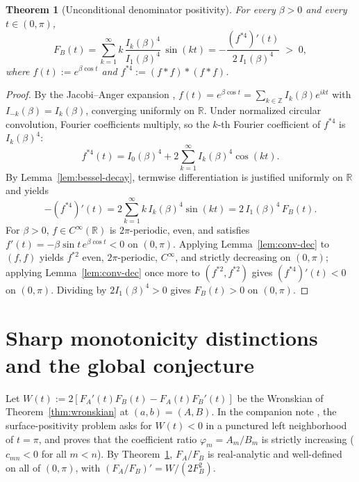 \documentclass[11pt]{article}
\newtheorem{theorem}{Theorem}
\theoremstyle{remark}
\begin{document}
\begin{theorem}[Unconditional denominator positivity]
\label{thm:denom-pos}
For every $\beta > 0$ and every $t \in (0,\pi)$,
\[
F_B(t) = \sum_{k=1}^\infty k\,\frac{I_k(\beta)^4}{I_1(\beta)^4}\,\sin(kt)
= -\frac{(f^{*4})'(t)}{2\,I_1(\beta)^4} \;>\; 0,
\]
where $f(t) := e^{\beta\cos t}$ and $f^{*4} := (f*f)*(f*f)$.
\end{theorem}

\begin{proof}
By the Jacobi--Anger expansion \cite[10.35.2]{DLMF},
$f(t) = e^{\beta\cos t} = \sum_{k\in\mathbb{Z}} I_k(\beta) e^{ikt}$ with
$I_{-k}(\beta) = I_k(\beta)$, converging uniformly on $\mathbb{R}$. Under normalized
circular convolution, Fourier coefficients multiply, so the $k$-th Fourier coefficient of
$f^{*4}$ is $I_k(\beta)^4$:
\[
f^{*4}(t) = I_0(\beta)^4 + 2\sum_{k=1}^\infty I_k(\beta)^4 \cos(kt).
\]
By Lemma~\ref{lem:bessel-decay}, termwise differentiation is justified uniformly on
$\mathbb{R}$ and yields
\[
-(f^{*4})'(t) = 2\sum_{k=1}^\infty k\,I_k(\beta)^4\sin(kt) = 2\,I_1(\beta)^4\,F_B(t).
\]
For $\beta > 0$, $f \in C^\infty(\mathbb{R})$ is $2\pi$-periodic, even, and satisfies
$f'(t) = -\beta\sin t\,e^{\beta\cos t} < 0$ on $(0,\pi)$. Applying
Lemma~\ref{lem:conv-dec} to $(f,f)$ yields $f^{*2}$ even, $2\pi$-periodic, $C^\infty$,
and strictly decreasing on $(0,\pi)$; applying Lemma~\ref{lem:conv-dec} once more to
$(f^{*2}, f^{*2})$ gives $(f^{*4})'(t) < 0$ on $(0,\pi)$. Dividing by
$2 I_1(\beta)^4 > 0$ gives $F_B(t) > 0$ on $(0,\pi)$.
\end{proof}

\section{Sharp monotonicity distinctions and the global conjecture}
\label{sec:conjecture}

Let $W(t) := 2[F_A'(t)F_B(t) - F_A(t)F_B'(t)]$ be the Wronskian of Theorem~\ref{thm:wronskian}
at $(a,b)=(A,B)$. In the companion note \cite{PhiLemma}, the surface-positivity problem
asks for $W(t) < 0$ in a punctured left neighborhood of $t = \pi$, and proves that the
coefficient ratio $\varphi_m = A_m/B_m$ is strictly increasing ($c_{mn} < 0$ for all
$m < n$). By Theorem~\ref{thm:denom-pos}, $F_A/F_B$ is real-analytic and well-defined on
all of $(0,\pi)$, with $(F_A/F_B)' = W/(2F_B^2)$.
\end{document}
